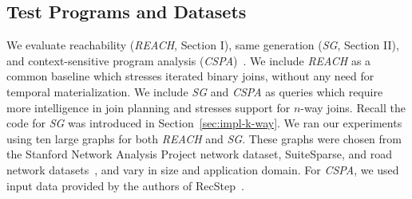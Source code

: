 \documentclass[nonacm,sigplan]{acmart}
\newcommand{\tool}{\textsc{GPUlog}}
\begin{document}
\subsection{Test Programs and Datasets}

We evaluate reachability (\textit{REACH}, Section I), same generation (\textit{SG}, Section II), and context-sensitive program analysis (\textit{CSPA})~\cite{lam2005context}. We include \textit{REACH} as a common baseline which stresses iterated binary joins, without any need for temporal materialization. We include \textit{SG} and \textit{CSPA} as queries which require more intelligence in join planning and stresses support for $n$-way joins. Recall the code for \textit{SG} was introduced in Section~\ref{sec:impl-k-way}. %
We ran our experiments using ten large graphs for both \textit{REACH} and \textit{SG}. These graphs were chosen from the Stanford Network Analysis Project network dataset, SuiteSparse, and road network datasets~\cite{snapnets, suitesparse, li2005trip}, and vary in size and application domain. For \textit{CSPA}, we used input data provided by the authors of RecStep~\cite{recstep}.

\end{document}
